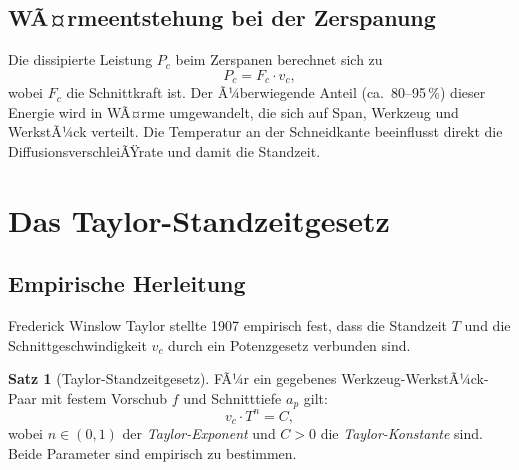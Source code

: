 ﻿\documentclass[a4paper,12pt]{article}
\theoremstyle{definition}
\newtheorem{satz}{Satz}
\begin{document}
\subsection{WÃ¤rmeentstehung bei der Zerspanung}

Die dissipierte Leistung $P_c$ beim Zerspanen berechnet sich zu
\[
  P_c = F_c \cdot v_c,
\]
wobei $F_c$ die Schnittkraft ist. Der Ã¼berwiegende Anteil (ca.\ 80--95\,\%)
dieser Energie wird in WÃ¤rme umgewandelt, die sich auf Span, Werkzeug und
WerkstÃ¼ck verteilt. Die Temperatur an der Schneidkante beeinflusst direkt die
DiffusionsverschleiÃŸrate und damit die Standzeit.

\section{Das Taylor-Standzeitgesetz}
\label{sec:standzeit}

\subsection{Empirische Herleitung}

Frederick Winslow Taylor stellte 1907 empirisch fest, dass die Standzeit $T$
und die Schnittgeschwindigkeit $v_c$ durch ein Potenzgesetz verbunden sind.

\begin{satz}[Taylor-Standzeitgesetz]
\label{satz:taylor}
  FÃ¼r ein gegebenes Werkzeug-WerkstÃ¼ck-Paar mit festem Vorschub $f$ und
  Schnitttiefe $a_p$ gilt:
  \[
    v_c \cdot T^n = C,
  \]
  wobei $n \in (0, 1)$ der \emph{Taylor-Exponent} und $C > 0$ die
  \emph{Taylor-Konstante} sind. Beide Parameter sind empirisch zu bestimmen.
\end{satz}
\end{document}

